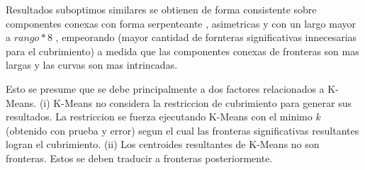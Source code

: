 Resultados suboptimos similares se obtienen de forma consistente %
sobre componentes conexas con forma serpenteante ,
  asimetricas y con un largo mayor a $rango*8$ 
, empeorando (mayor cantidad de fornteras significativas
innecesarias para el cubrimiento) a medida que las componentes conexas de
fronteras son mas largas y las curvas son mas intrincadas.




Esto se presume que se debe principalmente a dos factores relacionados a
K-Means. (i) K-Means no considera la restriccion de cubrimiento para generar sus
resultados. La restriccion se fuerza ejecutando K-Means con el minimo $k$
(obtenido con prueba y error) segun el cual las fronteras significativas
resultantes logran el cubrimiento. (ii) Los centroides resultantes de K-Means
no son fronteras. Estos se deben traducir a fronteras posteriormente.




